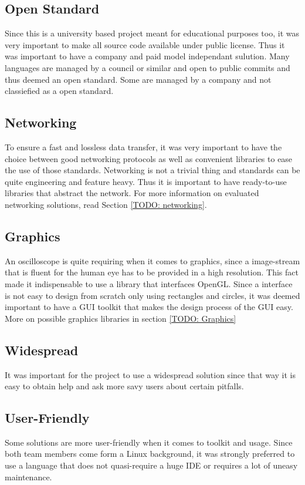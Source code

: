 \subsection*{Open Standard} Since this is a university based project meant for educational purposes too, it was very important to make all source code available under public license. Thus it was important to have a company and paid model independant sulution. Many languages are managed by a council or similar and open to public commits and thus deemed an open standard. Some are managed by a company and not classiefied as a open standard.

\subsection*{Networking} To ensure a fast and lossless data transfer, it was very important to have the choice between good networking protocols as well as convenient libraries to ease the use of those standards.
Networking is not a trivial thing and standards can be quite engineering and feature heavy. Thus it is important to have ready-to-use libraries that abstract the network. For more information on evaluated networking solutions, read Section \ref{TODO: networking}.

\subsection*{Graphics} An oscilloscope is quite requiring when it comes to graphics, since a image-stream that is fluent for the human eye has to be provided in a high resolution. This fact made it indispensable to use a library that interfaces OpenGL. Since a interface is not easy to design from scratch only using rectangles and circles, it was deemed important to have a GUI toolkit that makes the design process of the GUI easy. More on possible graphics libraries in section \ref{TODO: Graphics}

\subsection*{Widespread} It was important for the project to use a widespread solution since that way it is easy to obtain help and ask more savy users about certain pitfalls.

\subsection*{User-Friendly} Some solutions are more user-friendly when it comes to toolkit and usage. Since both team members come form a Linux background, it was strongly preferred to use a language that does not quasi-require a huge IDE or requires a lot of uneasy maintenance.

